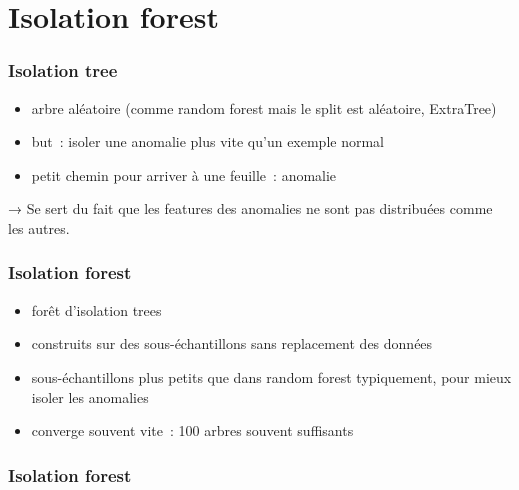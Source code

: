 \documentclass{formation}
\begin{document}
\section{Isolation forest}

\begin{frame}
  \frametitle{Isolation tree}
  \begin{itemize}
  \item arbre aléatoire (comme random forest mais le split est
    aléatoire, ExtraTree)
  \item but : isoler une anomalie plus vite qu'un exemple normal
  \item petit chemin pour arriver à une feuille : anomalie
  \end{itemize}

  → Se sert du fait que les features des anomalies ne sont pas
  distribuées comme les autres.
\end{frame}

\begin{frame}
  \frametitle{Isolation forest}
  \begin{itemize}
  \item forêt d'isolation trees
  \item construits sur des sous-échantillons sans replacement des
    données
  \item sous-échantillons plus petits que dans random forest
    typiquement, pour mieux isoler les anomalies
  \item converge souvent vite : 100 arbres souvent suffisants
  \end{itemize}
\end{frame}

\begin{frame}
  \frametitle{Isolation forest}
\end{frame}
\end{document}
